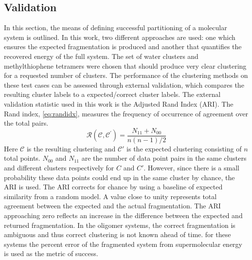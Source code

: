  
\subsection{\label{sec:frag_val} Validation}

In this section, the means of defining successful partitioning of a molecular system is outlined.
In this work, two different approaches are used: one which ensures the expected fragmentation is produced and another that quantifies the recovered energy of the full system.
The set of water clusters and methylthiophene tetramers were chosen that should produce very clear clustering for a requested number of clusters.
The performance of the clustering methods on these test cases can be assessed through external validation, which compares the resulting cluster labels to a expected/correct cluster labels.\autocite{Hubert1985,meila_comparing_2007}
The external validation statistic used in this work is the Adjusted Rand Index (ARI).
The Rand index, \ref{eq:randidx}, measures the frequency of occurrence of agreement over the total pairs.
\begin{equation}
\label{eq:randidx}
\mathcal{R}\left(\mathcal{C}, \mathcal{C}^{\prime}\right)=\frac{N_{11}+N_{00}}{n(n-1) / 2}
\end{equation}
\noindent Here $\mathcal{C}$ is the resulting clustering and $\mathcal{C'}$ is the expected clustering consisting of $n$ total points. 
$N_{00}$ and $N_{11}$ are the number of data point pairs in the same clusters and different clusters respectively for $C$ and $C'$.
However, since there is a small probability these data points could end up in the same cluster by chance, the ARI is used.
The ARI corrects for chance by using a baseline of expected similarity from a random model.
A value close to unity represents total agreement between the expected and the actual fragmentation.
The ARI approaching zero reflects an increase in the difference between the expected and returned fragmentation. 
In the oligomer systems, the correct fragmentation is ambiguous and thus correct clustering is not known ahead of time. for these systems the percent error of the fragmented system from supermolecular energy is used as the metric of success.

